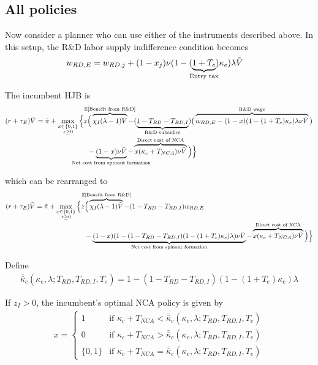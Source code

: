 \documentclass[11pt,english]{article}
\theoremstyle{remark}
\begin{document}
\subsection{All policies}

Now consider a planner who can use either of the instruments described above. In this setup, the R\&D labor supply indifference condition becomes
\begin{align}
w_{RD,E} &= w_{RD,j} + (1-x_j) \nu (1-(\underbrace{1+T_e}_{\mathclap{\text{Entry tax}}})\kappa_e) \lambda \tilde{V} \label{eq:RD_worker_indifference_all}
\end{align}

The incumbent HJB is
\begin{align}
(r + \tau_E) \tilde{V} = \tilde{\pi} + \max_{\substack{x \in \{0,1\} \\ z \ge 0}} \Big\{z &\Big( \overbrace{\chi_I (\lambda - 1) \tilde{V}}^{\mathclap{\mathbb{E}[\textrm{Benefit from R\&D}]}}-  (\underbrace{1 - T_{RD} - T_{RD,I}}_{\mathclap{\text{R\&D subsidies}}})\big( \overbrace{w_{RD,E} - (1-x)(1-(1+T_e)\kappa_e)\lambda \nu \tilde{V}}^{\mathclap{\text{R\&D wage}}}\big) \label{eq:hjb_incumbent_all} \nonumber \\ 
&-  \underbrace{(1-x) \nu \tilde{V}}_{\mathclap{\text{Net cost from spinout formation}}} - \overbrace{x (\kappa_{c} + T_{NCA}) \nu \tilde{V}}^{\mathclap{\text{Direct cost of NCA}}}\Big) \Big\} 
\end{align}

which can be rearranged to
\begin{align}
(r + \tau_E) \tilde{V} = \tilde{\pi} + \max_{\substack{x \in \{0,1\} \\ z \ge 0}} \Big\{z &\Big( \overbrace{\chi_I (\lambda - 1) \tilde{V}}^{\mathclap{\mathbb{E}[\textrm{Benefit from R\&D}]}}- (1-T_{RD}- T_{RD,I})w_{RD,E} \\
&-  \underbrace{(1-x)(1 - (1-T_{RD} - T_{RD,I})(1-(1+T_e)\kappa_{e})\lambda)\nu \tilde{V}}_{\mathclap{\text{Net cost from spinout formation}}} - \overbrace{x (\kappa_{c} + T_{NCA}) \nu \tilde{V}}^{\mathclap{\text{Direct cost of NCA}}}\Big) \Big\} \label{eq:hjb_incumbent_all_2}
\end{align}

Define
\begin{align}
\bar{\bar{\kappa}}_c(\kappa_e,\lambda;T_{RD},T_{RD,I},T_e) = 1 - (1-T_{RD} - T_{RD,I})(1-(1+T_e)\kappa_e)\lambda  \label{eq:barkappa_all}
\end{align} 

If $z_I > 0$, the incumbent's optimal NCA policy is given by 
\begin{align}
x = \begin{cases}
1 & \textrm{if } \kappa_{c} + T_{NCA} < \bar{\bar{\kappa}}_c (\kappa_e, \lambda;T_{RD},T_{RD,I},T_e)\\
0 & \textrm{if } \kappa_{c} + T_{NCA} > \bar{\bar{\kappa}}_c (\kappa_e, \lambda;T_{RD},T_{RD,I},T_e)\\
\{0,1\} & \textrm{if } \kappa_c + T_{NCA} = \bar{\bar{\kappa}}_c (\kappa_e, \lambda;T_{RD},T_{RD,I},T_e)
\end{cases} \label{eq:nca_policy_all}
\end{align}
\end{document}

